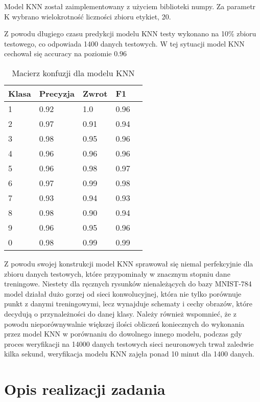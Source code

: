 \documentclass{article}
\begin{document}
Model KNN został zaimplementowany z użyciem biblioteki numpy. Za parametr K 
wybrano wielokrotność liczności zbioru etykiet, 20.

Z powodu długiego czasu predykcji modelu KNN testy wykonano na 10\% zbioru testowego, co odpowiada 1400 danych testowych.
W tej sytuacji model KNN cechował się accuracy na poziomie $0.96$

\begin{table}[H]
    \centering
    \begin{tabular}{|l|l|l|l|l|}
    \hline
    Klasa & Precyzja & Zwrot & F1 \\
    \hline
    1     & 0.92     & 1.0   & 0.96 \\
    2     & 0.97     & 0.91  & 0.94 \\
    3     & 0.98     & 0.95  & 0.96 \\
    4     & 0.96     & 0.96  & 0.96 \\
    5     & 0.96     & 0.98  & 0.97 \\
    6     & 0.97     & 0.99  & 0.98 \\
    7     & 0.93     & 0.94  & 0.93 \\
    8     & 0.98     & 0.90  & 0.94 \\
    9     & 0.96     & 0.95  & 0.96 \\
    0     & 0.98     & 0.99  & 0.99 \\
    \hline
    \end{tabular}
    \caption{Macierz konfuzji dla modelu KNN}
\end{table}

Z powodu swojej konstrukcji model KNN sprawował się niemal perfekcyjnie 
dla zbioru danych testowych, które przypominały w znacznym stopniu 
dane treningowe. Niestety dla ręcznych rysunków nienależących do 
bazy MNIST-784 model działał dużo gorzej od sieci konwolucyjnej, 
która nie tylko porównuje punkt z danymi treningowymi, lecz 
wynajduje schematy i cechy obrazów, które decydują o 
przynależności do danej klasy. Należy również wspomnieć, 
że z powodu nieporównywalnie większej ilości obliczeń 
koniecznych do wykonania przez model KNN w porównaniu 
do dowolnego innego modelu, podczas gdy proces weryfikacji 
na 14000 danych testowych sieci neuronowych trwał zaledwie 
kilka sekund, weryfikacja modelu KNN zajęła ponad 10 minut dla 1400 danych.


\section{Opis realizacji zadania}
\end{document}
